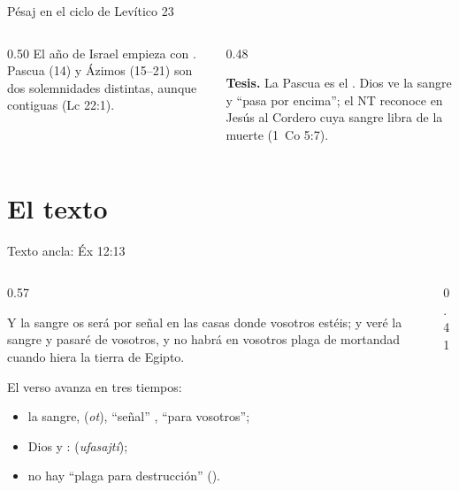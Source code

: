 \begin{frame}{Pésaj en el ciclo de Levítico 23}
\begin{columns}[t,onlytextwidth]
\begin{column}{0.50\textwidth}
\scriptsize\RaggedRight El año de Israel empieza con . Pascua (14) y Ázimos (15--21) son dos solemnidades distintas, aunque contiguas (Lc 22:1).
\end{column}
\begin{column}{0.48\textwidth}
\begin{tcolorbox}[colback=papiro,colframe=tierraroja,boxrule=1pt,arc=3pt,fontupper=\scriptsize]
\textbf{Tesis.} La Pascua es el . Dios ve la sangre y ``pasa por encima''; el NT reconoce en Jesús al Cordero cuya sangre libra de la muerte (1~Co 5:7).
\end{tcolorbox}
\end{column}
\end{columns}
\end{frame}

\section{El texto}

\begin{frame}{Texto ancla: Éx 12:13}
\begin{columns}[c,onlytextwidth]
\begin{column}{0.57\textwidth}
\begin{cita}Y la sangre os será por señal en las casas donde vosotros estéis; y veré la sangre y pasaré de vosotros, y no habrá en vosotros plaga de mortandad cuando hiera la tierra de Egipto.\end{cita}
\small\RaggedRight El verso avanza en tres tiempos:
\begin{itemize}\small
\item la sangre,  (\emph{ot}), ``señal'' , ``para vosotros'';
\item Dios  y :  (\emph{ufasajtí});
\item no hay ``plaga para destrucción'' ().
\end{itemize}
\end{column}
\begin{column}{0.41\textwidth}\end{column}
\end{columns}
\end{frame}

